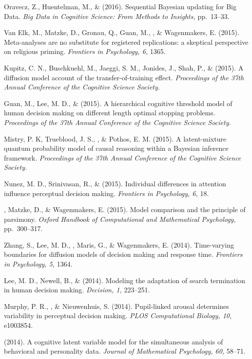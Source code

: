 \item[33.] Oravecz, Z., Huentelman, M., \& \vdkh{} (2016). Sequential Bayesian updating for Big Data. {\em Big Data in Cognitive Science: From Methods to Insights,} pp.~13--33.
\item[32.] Van Elk, M., Matzke, D., Gronau, Q., Guan, M., \vdkh{}, \& Wagenmakers, E. (2015). Meta-analyses are no substitute for registered replications: a skeptical perspective on religious priming. {\em Frontiers in Psychology, 6,} 1365.
\item[31.] Kupitz, C. N., Buschkuehl, M., Jaeggi, S. M., Jonides, J., Shah, P., \& \vdkh{} (2015). A diffusion model account of the transfer-of-training effect. {\em Proceedings of the 37th Annual Conference of the Cognitive Science Society.}
\item[30.] Guan, M., Lee, M. D., \& \vdkh{} (2015). A hierarchical cognitive threshold model of human decision making on different length optimal stopping problems. {\em Proceedings of the 37th Annual Conference of the Cognitive Science Society.}
\item[29.] Mistry, P. K, Trueblood, J. S., \vdkh{}, \& Pothos, E. M. (2015). A latent-mixture quantum probability model of causal reasoning within a Bayesian inference framework. {\em Proceedings of the 37th Annual Conference of the Cognitive Science Society.}
\item[28.] Nunez, M. D., Srinivasan, R., \& \vdkh{} (2015). Individual differences in attention influence perceptual decision making. {\em Frontiers in Psychology, 6,} 18.
\item[27.] \vdkh{}, Matzke, D., \& Wagenmakers, E. (2015). Model comparison and the principle of parsimony. {\em Oxford Handbook of Computational and Mathematical Psychology,} pp.~300--317.
\item[26.] Zhang, S., Lee, M. D., \vdkh{}, Maris, G., \& Wagenmakers, E. (2014). Time-varying boundaries for diffusion models of decision making and response time. {\em Frontiers in Psychology, 5,} 1364.
\item[25.] Lee, M. D., Newell, B., \& \vdkh{} (2014). Modeling the adaptation of search termination in human decision making. {\em Decision, 1,} 223--251.
\item[24.] Murphy, P. R., \vdkh{}, \& Nieuwenhuis, S. (2014). Pupil-linked arousal determines variability in perceptual decision making. {\em PLOS Computational Biology, 10,} e1003854.
\item[23.] \vdkh{} (2014). A cognitive latent variable model for the simultaneous analysis of behavioral and personality data. {\em Journal of Mathematical Psychology, 60,} 58--71.
